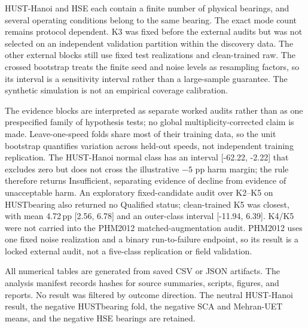 \documentclass[11pt]{article}
\newcommand{\SI}[2]{#1\,\ensuremath{#2}}
\newcommand{\pp}{\mathrm{pp}}
\begin{document}
HUST-Hanoi and HSE each contain a finite number of physical bearings, and
several operating conditions belong to the same bearing. The exact mode count
remains protocol dependent. K3 was fixed before the external audits but was not
selected on an independent validation partition within the discovery data.
The other external blocks still use fixed test realizations and clean-trained
raw. The crossed bootstrap treats the finite seed and noise levels as
resampling factors, so its interval is a sensitivity interval rather than a
large-sample guarantee. The synthetic simulation is not an empirical coverage
calibration.

The evidence blocks are interpreted as separate worked audits rather than as
one prespecified family of hypothesis tests; no global multiplicity-corrected
claim is made. Leave-one-speed folds share most of their training data, so the
unit bootstrap quantifies variation across held-out speeds, not independent
training replication. The HUST-Hanoi normal class has an interval
[-62.22, -2.22] that excludes zero but does not cross the illustrative
$-5$ pp harm margin; the rule therefore returns Insufficient, separating
evidence of decline from evidence of unacceptable harm. An exploratory
fixed-candidate audit over K2--K5 on HUSTbearing also returned no Qualified
status; clean-trained K5 was closest, with mean \SI{4.72}{\pp} [2.56, 6.78]
and an outer-class interval [-11.94, 6.39]. K4/K5 were not carried into the
PHM2012 matched-augmentation audit. PHM2012 uses one fixed noise realization
and a binary run-to-failure endpoint, so its result is a locked external
audit, not a five-class replication or field validation.

All numerical tables are generated from saved CSV or JSON artifacts. The
analysis manifest records hashes for source summaries, scripts, figures, and
reports. No result was filtered by outcome direction. The neutral HUST-Hanoi
result, the negative HUSTbearing fold, the negative SCA and Mehran-UET means,
and the negative HSE bearings are retained.



\end{document}
